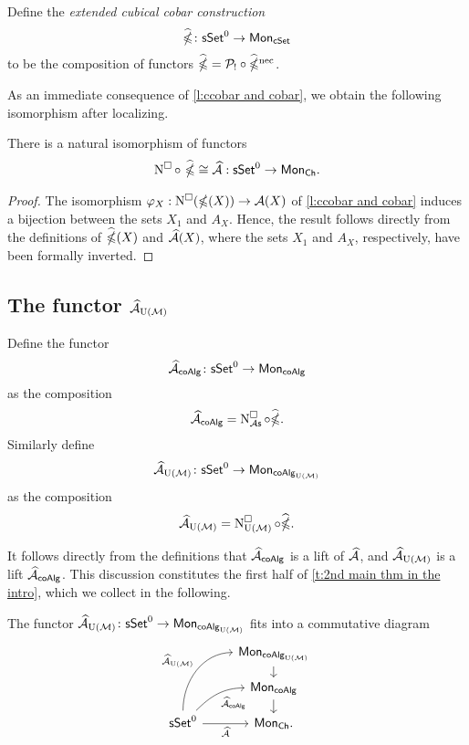 Define the \textit{extended cubical cobar construction}
\begin{equation*}
\widehat{\ccobar} \colon \sSet^0 \to \Mon_{\cSet}
\end{equation*}
to be the composition of functors $\widehat{\ccobar} = \mathcal{P}_{!} \circ \ncobarE$. 

As an immediate consequence of \cref{l:ccobar and cobar}, we obtain the following isomorphism after localizing. 

\begin{corollary}
	There is a natural isomorphism of functors
	$$\cchains \circ\ \widehat{\ccobar} \cong \Ahat :\sSet^0 \to \Mon_{\Ch}.$$
\end{corollary}

\begin{proof}
	The isomorphism $\varphi_X: \cchains(\ccobar(X))\to \A(X)$
	of \cref{l:ccobar and cobar} induces a bijection between the sets
	$X_1$ and $A_X$.
	Hence, the result follows directly from the definitions of  $\ccobarE(X)$ and $\Ahat(X)$, where the sets $X_1$ and $A_X$, respectively, have been formally inverted.
\end{proof}

\subsection{The functor $\Ahat_{\UM}$} \label{s:ahatum}

Define the functor
$$\Ahat_{\coAlg} \colon \sSet^0 \to \Mon_{\coAlg}$$
as the composition
$$\Ahat_{\coAlg} = \cchainsAS \circ \widehat{\ccobar}.$$
Similarly define
$$\Ahat_{\UM} \colon \sSet^0 \to \Mon_{\coAlg_{\UM}}$$
as the composition
$$\Ahat_{\UM} = \cchainsUM \circ \widehat{\ccobar}.$$

It follows directly from the definitions that $\Ahat_{\coAlg}$ is a lift of $\Ahat$, and $\Ahat_{\UM}$ is a lift $\Ahat_{\coAlg}$. This discussion constitutes the first half of \cref{t:2nd main thm in the intro}, which we collect in the following.
\begin{lemma}

The functor $\Ahat_\UM \colon \sSet^0 \to \Mon_{\coAlg_\UM}$ fits into a commutative diagram
	\begin{equation*}
	\begin{tikzcd}[row sep=small]
	& \Mon_{\coAlg_\UM} \arrow[d] \\
	& \Mon_{\coAlg} \arrow[d] \\
	\sSet^0
	\arrow[r, "\Ahat"', ]
	\arrow[ru, "\Ahat_{\coAlg}"', out=45, in=180] 
	\arrow[ruu, "\Ahat_\UM", out=90, in=180]
	& \Mon_{\Ch}.
	\end{tikzcd}
	\end{equation*}
\end{lemma}

